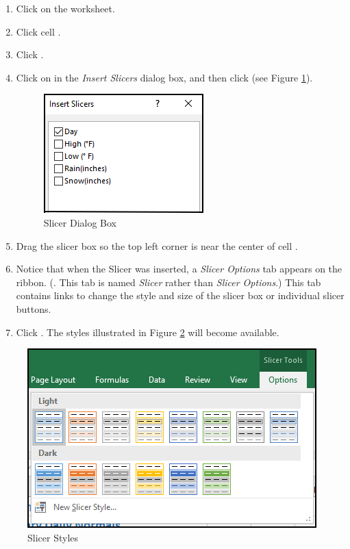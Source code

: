 \begin{enumerate}
	\item Click on the  worksheet. 
	\item Click cell .
	\item Click .
	\item Click on  in the \textit{Insert Slicers} dialog box, and then click  (see Figure \ref{05:fig20a}).

	\begin{figure}[H]
		\centering
		\includegraphics[width=\maxwidth{.50\linewidth}]{gfx/ch05_fig20a}
		\caption{Slicer Dialog Box}
		\label{05:fig20a}
	\end{figure}
	
	\item Drag the slicer box so the top left corner is near the center of cell .
	\item Notice that when the Slicer was inserted, a \textit{Slicer Options} tab appears on the ribbon. (. This tab is named \textit{Slicer} rather than \textit{Slicer Options}.) This tab contains links to change the style and size of the slicer box or individual slicer buttons.
	\item Click . The styles illustrated in Figure \ref{05:fig20} will become available.
\end{enumerate}

\begin{figure}[H]
	\centering
	\includegraphics[width=\maxwidth{.95\linewidth}]{gfx/ch05_fig20}
	\caption{Slicer Styles}
	\label{05:fig20}
\end{figure}

